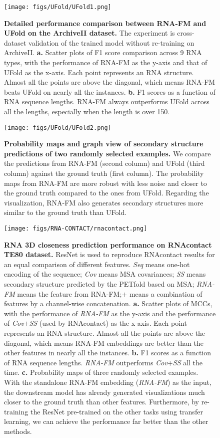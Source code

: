 \renewcommand\figurename{Appendix Figure}

\begin{figure}[!t]
\centering
\texttt{[image: figs/UFold/UFold1.png]} 
\caption{\textbf{Detailed performance comparison between RNA-FM and UFold on the ArchiveII dataset.} The experiment is cross-dataset validation of the trained model without re-training on ArchiveII. \textbf{a.} Scatter plots of F1 score comparison across 9 RNA types, with the performance of RNA-FM as the y-axis and that of UFold as the x-axis. Each point represents an RNA structure. Almost all the points are above the diagonal, which means RNA-FM beats UFold on nearly all the instances. \textbf{b.} F1 scores as a function of RNA sequence lengths. RNA-FM always outperforms UFold across all the lengths, especially when the length is over 150.} 
\label{Fig.UFold1}
\end{figure}

\begin{figure}[!th]
\centering
\texttt{[image: figs/UFold/UFold2.png]} 
\caption{\textbf{Probability maps and graph view of secondary structure predictions of two randomly selected examples.} We compare the predictions from RNA-FM (second column) and UFold (third column) against the ground truth (first column). The probability maps from RNA-FM are more robust with less noise and closer to the ground truth compared to the ones from UFold. Regarding the visualization, RNA-FM also generates secondary structures more similar to the ground truth than UFold.}
\label{Fig.UFold2}
\end{figure}

\begin{figure}[!th]
\centering
\texttt{[image: figs/RNA-CONTACT/rnacontact.png]}
\caption{\textbf{RNA 3D closeness prediction performance on RNAcontact TE80 dataset.} ResNet is used to reproduce RNAcontact results for an equal comparison of different features. \textit{Seq} means one-hot encoding of the sequence; \textit{Cov} means MSA covariances; \textit{SS} means secondary structure predicted by the PETfold based on MSA; \textit{RNA-FM} means the feature from RNA-FM;$+$ means a combination of features by a channel-wise concatenation. \textbf{a.} Scatter plots of MCCs, with the performance of \textit{RNA-FM} as the y-axis and the performance of \textit{Cov$+$SS} (used by RNAcontact) as the x-axis. Each point represents an RNA structure. Almost all the points are above the diagonal, which means RNA-FM embeddings are better than the other features in nearly all the instances. \textbf{b.} F1 scores as a function of RNA sequence lengths. \textit{RNA-FM} outperforms \textit{Cov$+$SS} all the time. \textbf{c.} Probability maps of three randomly selected examples. With the standalone RNA-FM embedding (\textit{RNA-FM}) as the input, the downstream model has already generated visualizations much closer to the ground truth than other features. Furthermore, by re-training the ResNet pre-trained on the other tasks using transfer learning, we can achieve the performance far better than the other methods.} 
\label{Fig.rnacontact}
\end{figure}

